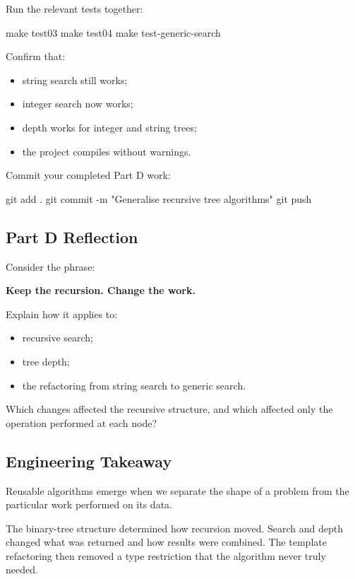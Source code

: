 \documentclass{csc2059practical}
\begin{document}
Run the relevant tests together:

\begin{terminal}
make test03
make test04
make test-generic-search
\end{terminal}

Confirm that:

\begin{itemize}
    \item string search still works;
    \item integer search now works;
    \item depth works for integer and string trees;
    \item the project compiles without warnings.
\end{itemize}

Commit your completed Part D work:

\begin{terminal}
git add .
git commit -m "Generalise recursive tree algorithms"
git push
\end{terminal}

\subsection{Part D Reflection}

\begin{reflectionbox}
Consider the phrase:

\begin{center}
\textbf{Keep the recursion. Change the work.}
\end{center}

Explain how it applies to:

\begin{itemize}
    \item recursive search;
    \item tree depth;
    \item the refactoring from string search to generic search.
\end{itemize}

Which changes affected the recursive structure, and which affected only the
operation performed at each node?
\end{reflectionbox}

\subsection{Engineering Takeaway}

\begin{importantnote}
Reusable algorithms emerge when we separate the shape of a problem from the
particular work performed on its data.

The binary-tree structure determined how recursion moved. Search and depth
changed what was returned and how results were combined. The template
refactoring then removed a type restriction that the algorithm never truly
needed.
\end{importantnote}
\end{document}
